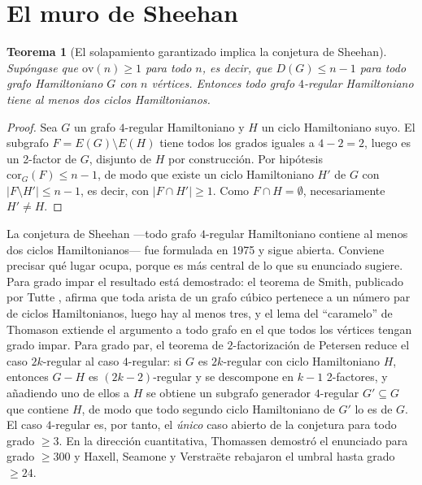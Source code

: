 \documentclass[11pt,a4paper]{article}
\newtheorem{teorema}{Teorema}[section]
\theoremstyle{definition}
\theoremstyle{remark}
\begin{document}
\section{El muro de Sheehan}\label{sec:sheehan}

\begin{teorema}[El solapamiento garantizado implica la conjetura de Sheehan]\label{thm:sheehan}
Supóngase que $\mathrm{ov}(n)\ge1$ para todo $n$, es decir, que $D(G)\le n-1$ para todo grafo Hamiltoniano $G$ con $n$ vértices. Entonces todo grafo $4$-regular Hamiltoniano tiene al menos dos ciclos Hamiltonianos.
\end{teorema}

\begin{proof}
Sea $G$ un grafo $4$-regular Hamiltoniano y $H$ un ciclo Hamiltoniano suyo. El subgrafo $F=E(G)\setminus E(H)$ tiene todos los grados iguales a $4-2=2$, luego es un 2-factor de $G$, disjunto de $H$ por construcción. Por hipótesis $\mathrm{cor}_G(F)\le n-1$, de modo que existe un ciclo Hamiltoniano $H'$ de $G$ con $|F\setminus H'|\le n-1$, es decir, con $|F\cap H'|\ge1$. Como $F\cap H=\emptyset$, necesariamente $H'\ne H$.
\end{proof}

La conjetura de Sheehan \cite{sheehan} —todo grafo $4$-regular Hamiltoniano contiene al menos dos ciclos Hamiltonianos— fue formulada en 1975 y sigue abierta. Conviene precisar qué lugar ocupa, porque es más central de lo que su enunciado sugiere. Para grado impar el resultado está demostrado: el teorema de Smith, publicado por Tutte \cite{tutte46}, afirma que toda arista de un grafo cúbico pertenece a un número par de ciclos Hamiltonianos, luego hay al menos tres, y el lema del ``caramelo'' de Thomason \cite{thomason78} extiende el argumento a todo grafo en el que todos los vértices tengan grado impar. Para grado par, el teorema de $2$-factorización de Petersen reduce el caso $2k$-regular al caso $4$-regular: si $G$ es $2k$-regular con ciclo Hamiltoniano $H$, entonces $G-H$ es $(2k-2)$-regular y se descompone en $k-1$ 2-factores, y añadiendo uno de ellos a $H$ se obtiene un subgrafo generador $4$-regular $G'\subseteq G$ que contiene $H$, de modo que todo segundo ciclo Hamiltoniano de $G'$ lo es de $G$. El caso $4$-regular es, por tanto, el \emph{único} caso abierto de la conjetura para todo grado $\ge3$. En la dirección cuantitativa, Thomassen \cite{thomassen98} demostró el enunciado para grado $\ge300$ y Haxell, Seamone y Verstraëte \cite{hsv} rebajaron el umbral hasta grado $\ge24$.
\end{document}
